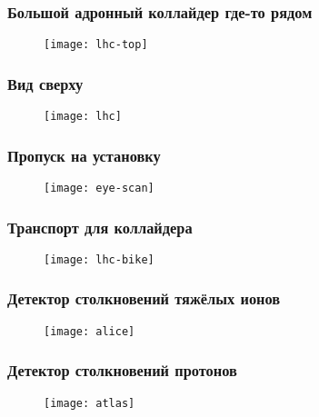 \begin{frame}
    \frametitle{Большой адронный коллайдер где-то рядом}
    \begin{figure}
        \begin{centering}
            \texttt{[image: lhc-top]}
        \end{centering}
    \end{figure}
\end{frame}
\begin{frame}
    \frametitle{Вид сверху}
    \begin{figure}
        \begin{centering}
            \texttt{[image: lhc]}
        \end{centering}
    \end{figure}
\end{frame}
\begin{frame}
    \frametitle{Пропуск на установку}
    \begin{figure}
        \begin{centering}
            \texttt{[image: eye-scan]}
        \end{centering}
    \end{figure}
\end{frame}
\begin{frame}
    \frametitle{Транспорт для коллайдера}
    \begin{figure}
        \begin{centering}
            \texttt{[image: lhc-bike]}
        \end{centering}
    \end{figure}
\end{frame}
\begin{frame}
    \frametitle{Детектор столкновений тяжёлых ионов}
    \begin{figure}
        \begin{centering}
            \texttt{[image: alice]}
        \end{centering}
    \end{figure}
\end{frame}
\begin{frame}
    \frametitle{Детектор столкновений протонов}
    \begin{figure}
        \begin{centering}
            \texttt{[image: atlas]}
        \end{centering}
    \end{figure}
\end{frame}
